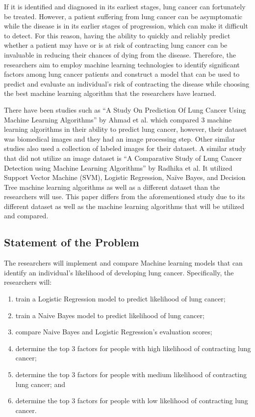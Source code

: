 \documentclass[runningheads]{llncs}
\begin{document}
If it is identified and diagnosed in its earliest stages, lung cancer can fortunately be treated. However, a patient suffering from lung cancer can be asymptomatic while the disease is in its earlier stages of progression, which can make it difficult to detect. For this reason, having the ability to quickly and reliably predict whether a patient may have or is at risk of contracting lung cancer can be invaluable in reducing their chances of dying from the disease. 
Therefore, the researchers aim to employ machine learning technologies to identify significant factors among lung cancer patients and construct a model that can be used to predict and evaluate an individual's risk of contracting the disease while choosing the best machine learning algorithm that the researchers have learned. 

There have been studies such as “A Study On Prediction Of Lung Cancer Using Machine Learning Algorithms” by Ahmad et al. \cite{gupta2022} which compared 3 machine learning algorithms in their ability to predict lung cancer, however, their dataset was biomedical images and they had an image processing step. Other similar studies also used a collection of labeled images for their dataset. A similar study that did not utilize an image dataset is “A Comparative Study of Lung Cancer Detection using Machine Learning Algorithms” by Radhika et al. \cite{radhika2019} It utilized Support Vector Machine (SVM), Logistic Regression, Naïve Bayes, and Decision Tree machine learning algorithms as well as a different dataset than the researchers will use. This paper differs from the aforementioned study due to its different dataset as well as the machine learning algorithms that will be utilized and compared.

\subsection{Statement of the Problem}
The researchers will implement and compare Machine learning models that can identify an individual’s likelihood of developing lung cancer. Specifically, the researchers will:
\begin{enumerate}
	\item train a Logistic Regression model to predict likelihood of lung cancer;
	\item train a Naive Bayes model to predict likelihood of lung cancer;
	\item compare Naive Bayes and Logistic Regression’s evaluation scores;
	\item determine the top 3 factors for people with high likelihood of contracting lung cancer; 
	\item determine the top 3 factors for people with medium likelihood of contracting lung cancer; and
	\item determine the top 3 factors for people with low likelihood of contracting lung cancer.
\end{enumerate}
\end{document}
